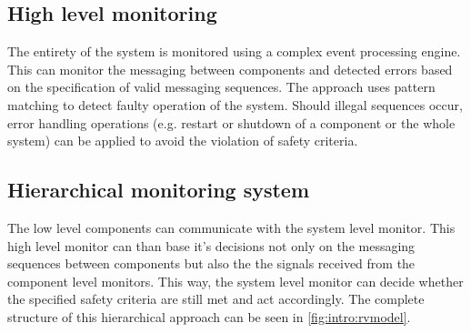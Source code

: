 \subsection{High level monitoring}
The entirety of the system is monitored using a complex event processing engine. This can monitor the messaging between components and detected errors based on the specification of valid messaging sequences. The approach uses pattern matching to detect faulty operation of the system. Should illegal sequences occur, error handling operations (e.g. restart or shutdown of a component or the whole system) can be applied to avoid the violation of safety criteria.

\subsection{Hierarchical monitoring system}
The low level components can communicate with the system level monitor. This high level monitor can than base it's decisions not only on the messaging sequences between components but also the the signals received from the component level monitors. This way, the system level monitor can decide whether the specified safety criteria are still met and act accordingly. The complete structure of this hierarchical approach can be seen in \cref{fig:intro:rvmodel}.

